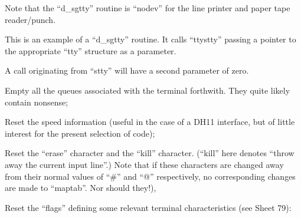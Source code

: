 Note that the ``d\_sgtty'' routine is
``nodev'' for the line printer and paper
tape reader/punch.


This is an example of a ``d\_sgtty'' routine. It calls ``ttystty'' passing a
pointer to the appropriate ``tty'' structure as a parameter.


A call originating from ``stty'' will
have a second parameter of zero.

\bd
\item[8589:] Empty all the queues associated
with the terminal forthwith. They
quite likely contain nonsense;

\item[8591:] Reset the speed information (useful in the
case of a DH11 interface, but of little interest for
the present selection of code);

Reset the ``erase'' character and
the ``kill'' character. (``kill''
here denotes ``throw away the
current input line''.) Note that
if these characters are changed
away from their normal values of
``\#'' and ``@'' respectively, no
corresponding changes are made to
``maptab''. Nor should they!),

\item[8593:] Reset the ``flags'' defining some
relevant terminal characteristics
(see Sheet 79):

